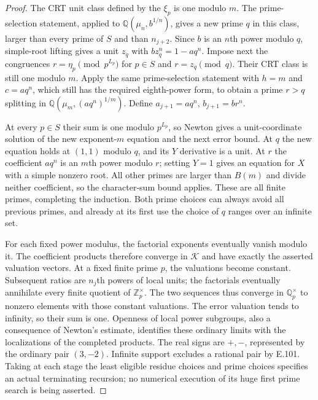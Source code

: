 \begin{proof}
The CRT unit class defined by the $\xi_p$ is one modulo $m$.
The prime-selection statement, applied to $\mathbb Q(\mu_n,b^{1/n})$,
gives a new prime $q$ in this class, larger than every prime of $S$
and than $n_{j+2}$. Since $b$ is an $n$th power modulo $q$,
simple-root lifting gives a unit $z_q$ with
$bz_q^n=1-aq^n$. Impose next the congruences
$r=\eta_p\pmod{p^{L_p}}$ for $p\in S$ and
$r=z_q\pmod q$. Their CRT class is still one modulo $m$.
Apply the same prime-selection statement with $h=m$ and
$c=aq^n$, which still has the required eighth-power form, to obtain a
prime $r>q$ splitting in $\mathbb Q(\mu_m,(aq^n)^{1/m})$.
Define $a_{j+1}=aq^n$, $b_{j+1}=br^n$.

At every $p\in S$ their sum is one modulo $p^{L_p}$, so Newton gives
a unit-coordinate solution of the new exponent-$m$ equation and the
next error bound. At $q$ the new equation holds at $(1,1)$ modulo $q$,
and its $Y$ derivative is a unit. At $r$ the coefficient $aq^n$ is an
$m$th power modulo $r$; setting $Y=1$ gives an equation for $X$ with a
simple nonzero root. All other primes are larger than $B(m)$ and divide
neither coefficient, so the character-sum bound applies. These are all
finite primes, completing the induction. Both prime choices can always
avoid all previous primes, and already at its first use the choice of
$q$ ranges over an infinite set.

For each fixed power modulus, the factorial exponents eventually
vanish modulo it. The coefficient products therefore converge in
$\mathcal K$ and have exactly the asserted valuation vectors. At a
fixed finite prime $p$, the valuations become constant. Subsequent
ratios are $n_j$th powers of local units; the factorials eventually
annihilate every finite quotient of $\mathbb Z_p^\times$. The two
sequences thus converge in $\mathbb Q_p^\times$ to nonzero elements
with those constant valuations. The error valuation tends to infinity,
so their sum is one. Openness of local power subgroups, also a
consequence of Newton's estimate, identifies these ordinary limits
with the localizations of the completed products. The real signs are
$+,-$, represented by the ordinary pair $(3,-2)$. Infinite support
excludes a rational pair by E.101. Taking at each stage the least
eligible residue choices and prime choices specifies an actual
terminating recursion; no numerical execution of its huge first
prime search is being asserted.
\end{proof}

